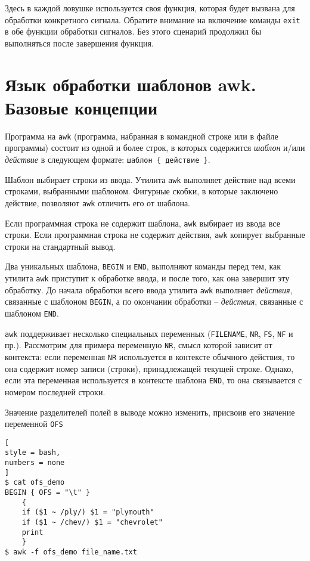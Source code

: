 \documentclass[%
	11pt,
	a4paper,
	utf8,
		]{article}
\begin{document}
Здесь в каждой ловушке используется своя функция, которая будет вызвана для обработки конкретного сигнала. Обратите внимание на включение команды \texttt{exit} в обе функции обработки сигналов. Без этого сценарий продолжил бы выполняться после завершения функция.

\section{Язык обработки шаблонов awk. Базовые концепции}

Программа на \texttt{awk} (программа, набранная в командной строке или в файле программы) состоит из одной и более строк, в которых содержится \emph{шаблон} и/или \emph{действие} в следующем формате: \verb|шаблон { действие }|.

Шаблон выбирает строки из ввода. Утилита \texttt{awk} выполняет действие над всеми строками, выбранными шаблоном. Фигурные скобки, в которые заключено действие, позволяют \texttt{awk} отличить его от шаблона.

Если программная строка не содержит шаблона, \texttt{awk} выбирает из ввода все строки. Если программная строка не содержит действия, \texttt{awk} копирует выбранные строки на стандартный вывод.

Два уникальных шаблона, \texttt{BEGIN} и \texttt{END}, выполняют команды перед тем, как утилита \texttt{awk} приступит к обработке ввода, и после того, как она завершит эту обработку. До начала обработки всего ввода утилита \texttt{awk} выполняет \emph{действия}, связанные с шаблоном \texttt{BEGIN}, а по окончании обработки -- \emph{действия}, связанные с шаблоном \texttt{END}.

\texttt{awk} поддерживает несколько специальных переменных (\texttt{FILENAME}, \texttt{NR}, \texttt{FS}, \texttt{NF} и пр.). Рассмотрим для примера переменную \texttt{NR}, смысл которой зависит от контекста: если переменная \texttt{NR} используется в контексте обычного действия, то она содержит номер записи (строки), принадлежащей текущей строке. Однако, если эта переменная используется в контексте шаблона \texttt{END}, то она связывается с номером последней строки.

Значение разделителей полей в выводе можно изменить, присвоив его значение переменной \texttt{OFS}
\begin{lstlisting}[
style = bash,
numbers = none
]
$ cat ofs_demo
BEGIN { OFS = "\t" }
    {
    if ($1 ~ /ply/) $1 = "plymouth"
    if ($1 ~ /chev/) $1 = "chevrolet"
    print
    }
$ awk -f ofs_demo file_name.txt
\end{lstlisting}
\end{document}
